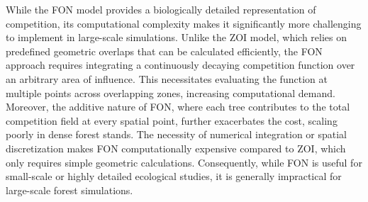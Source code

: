 While the FON model provides a biologically detailed representation of competition, its computational complexity makes it significantly more challenging to implement in large-scale simulations. Unlike the ZOI model, which relies on predefined geometric overlaps that can be calculated efficiently, the FON approach requires integrating a continuously decaying competition function over an arbitrary area of influence. This necessitates evaluating the function at multiple points across overlapping zones, increasing computational demand. Moreover, the additive nature of FON, where each tree contributes to the total competition field at every spatial point, further exacerbates the cost, scaling poorly in dense forest stands. The necessity of numerical integration or spatial discretization makes FON computationally expensive compared to ZOI, which only requires simple geometric calculations. Consequently, while FON is useful for small-scale or highly detailed ecological studies, it is generally impractical for large-scale forest simulations.









